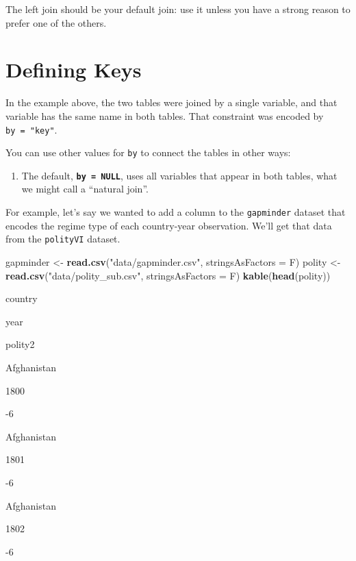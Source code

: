 \documentclass[]{book}
\newenvironment{Shaded}{\begin{snugshade}}{\end{snugshade}}
\newcommand{\DataTypeTok}[1]{\textcolor[rgb]{0.13,0.29,0.53}{#1}}
\newcommand{\KeywordTok}[1]{\textcolor[rgb]{0.13,0.29,0.53}{\textbf{#1}}}
\newcommand{\NormalTok}[1]{#1}
\newcommand{\StringTok}[1]{\textcolor[rgb]{0.31,0.60,0.02}{#1}}
\providecommand{\tightlist}{%
  \setlength{\itemsep}{0pt}\setlength{\parskip}{0pt}}
\begin{document}
The left join should be your default join: use it unless you have a strong reason to prefer one of the others.

\hypertarget{defining-keys}{%
\section{Defining Keys}\label{defining-keys}}

In the example above, the two tables were joined by a single variable, and that variable has the same name in both tables. That constraint was encoded by \texttt{by\ =\ "key"}.

You can use other values for \texttt{by} to connect the tables in other ways:

\begin{enumerate}
\def\labelenumi{\arabic{enumi}.}
\tightlist
\item
  The default, \textbf{\texttt{by\ =\ NULL}}, uses all variables that appear in both tables, what we might call a ``natural join''.
\end{enumerate}

For example, let's say we wanted to add a column to the \texttt{gapminder} dataset that encodes the regime type of each country-year observation. We'll get that data from the \texttt{polityVI} dataset.

\begin{Shaded}
\begin{Highlighting}[]
\NormalTok{gapminder <-}\StringTok{ }\KeywordTok{read.csv}\NormalTok{(}\StringTok{"data/gapminder.csv"}\NormalTok{, }\DataTypeTok{stringsAsFactors =}\NormalTok{ F)}
\NormalTok{polity <-}\StringTok{ }\KeywordTok{read.csv}\NormalTok{(}\StringTok{"data/polity_sub.csv"}\NormalTok{, }\DataTypeTok{stringsAsFactors =}\NormalTok{ F)}
\KeywordTok{kable}\NormalTok{(}\KeywordTok{head}\NormalTok{(polity))}
\end{Highlighting}
\end{Shaded}

country

year

polity2

Afghanistan

1800

-6

Afghanistan

1801

-6

Afghanistan

1802

-6
\end{document}
